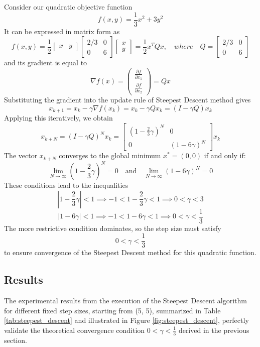 \documentclass[11pt]{article}
\begin{document}
Consider our quadratic objective function
$$
f(x,y) = \frac{1}{3}x^{2} + 3y^{2} 
$$
It can be expressed in matrix form as
$$
f(x, y) = \frac{1}{2} \begin{bmatrix}x & y\end{bmatrix} 
             \begin{bmatrix}2/3 &0\\0 & 6\end{bmatrix}
             \begin{bmatrix}x \\y\end{bmatrix}
        = \frac{1}{2}x^T Q x,
\quad where \quad
Q = \begin{bmatrix}2/3 &0\\0 & 6\end{bmatrix}
$$
and its gradient is equal to
$$
\nabla f(x) = \begin{pmatrix} \frac{\partial f}{\partial x_1} \\ \frac{\partial f}{\partial x_2} \end{pmatrix} = Qx
$$
Substituting the gradient into the update rule of Steepest Descent method gives
$$
x_{k+1} = x_k - \gamma \nabla f(x_k) = x_k - \gamma Q x_k = (I - \gamma Q) x_k
$$
Applying this iteratively, we obtain
$$
x_{k+N} = (I - \gamma Q)^N x_k 
        = \begin{bmatrix}(1-\frac{2}{3}\gamma)^N & 0 \\0 & (1-6\gamma)^N\end{bmatrix}x_k
$$
The vector $x_{k+N}$ converges to the global minimum $x^* = (0, 0)$ if and only if:
$$
\lim_{N \to \infty}(1-\frac{2}{3}\gamma)^N = 0 \quad \text{and} \quad \lim_{N \to \infty}(1-6\gamma)^N = 0
$$
These conditions lead to the inequalities
$$
|1-\frac{2}{3}\gamma| < 1 \implies -1 < 1-\frac{2}{3}\gamma < 1 \implies 0 < \gamma < 3
$$
$$
|1-6\gamma| < 1 \implies -1 < 1-6\gamma < 1 \implies 0 < \gamma < \frac{1}{3}
$$
The more restrictive condition dominates, so the step size must satisfy
$$
\boxed{0 < \gamma < \frac{1}{3}}
$$
to ensure convergence of the Steepest Descent method for this quadratic function.

\subsection{Results}

The experimental results from the execution of the Steepest Descent algorithm for different fixed step sizes, starting from (5, 5), summarized in Table \ref{tab:steepest_descent} and illustrated in Figure \ref{fig:steepest_descent}, perfectly validate the theoretical convergence condition $0 < \gamma < \frac{1}{3}$ derived in the previous section.
\end{document}
